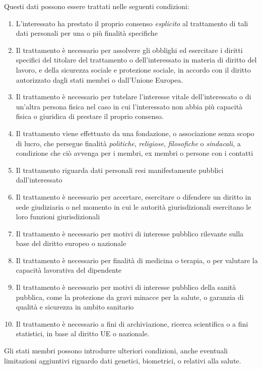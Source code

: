 Questi dati possono essere trattati nelle seguenti condizioni:
\begin{enumerate}
    \item L'interessato ha prestato il proprio consenso \textit{esplicito} al
        trattamento di tali dati personali per una o più finalità specifiche
    \item Il trattamento è necessario per assolvere gli obblighi ed esercitare
        i diritti specifici del titolare del trattamento o dell'interessato in
        materia di diritto del lavoro, e della sicurezza sociale e protezione
        sociale, in accordo con il diritto autorizzato dagli stati membri o
        dall'Unione Europea.
    \item Il trattamento è necessario per tutelare l'interesse vitale
        dell'interessato o di un'altra persona fisica nel caso in cui
        l'interessato non abbia più capacità fisica o giuridica di prestare il
        proprio consenso.
    \item Il trattamento viene effettuato da una fondazione, o associazione
        senza scopo di lucro, che persegue finalità \textit{politiche},
        \textit{religiose}, \textit{filosofiche} o \textit{sindacali}, a
        condizione che ciò avvenga per i membri, ex membri o persone con i
        contatti
    \item Il trattamento riguarda dati personali resi manifestamente pubblici
        dall'interessato
    \item Il trattamento è necessario per accertare, esercitare o difendere un
        diritto in sede giudiziaria o nel momento in cui le autorità
        giurisdizionali esercitano le loro funzioni giurisdizionali
    \item Il trattamento è necessario per motivi di interesse pubblico
        rilevante sulla base del diritto europeo o nazionale
    \item Il trattamento è necessario per finalità di medicina o terapia, o per
        valutare la capacità lavorativa del dipendente
    \item Il trattamento è necessario per motivi di interesse pubblico della
        sanità pubblica, come la protezione da gravi minacce per la salute, o
        garanzia di qualità e sicurezza in ambito sanitario
    \item Il trattamento è necessario a fini di archiviazione, ricerca
        scientifica o a fini statistici, in base al diritto UE o nazionale.
\end{enumerate}
Gli stati membri possono introdurre ulteriori condizioni, anche eventuali
limitazioni aggiuntivi riguardo dati genetici, biometrici, o relativi alla
salute.
